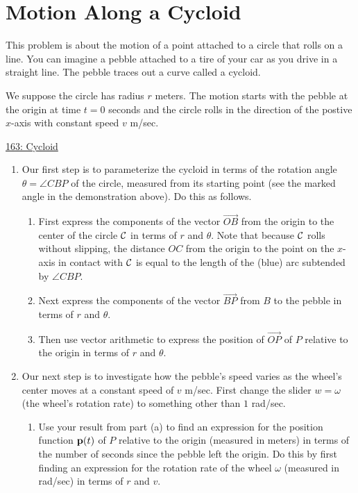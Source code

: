 \documentclass{ximera}
\begin{document}
\section{Motion Along a Cycloid}
\begin{question} \label{Q4950504333}
This problem is about the motion of a point attached to a circle that rolls on a line. You can imagine a pebble attached to a tire of your car as you drive in a straight line. The pebble traces out a curve called a cycloid.

We suppose the circle has radius $r$ meters. The motion starts with the pebble at the origin at time $t=0$ seconds and the circle rolls in the direction of the postive $x$-axis with constant speed $v$ m/sec.

\begin{onlineOnly}
    \begin{center}
\end{center}
\end{onlineOnly}

\href{https://www.geogebra.org/classic/rrzgbtfr}{163: Cycloid}

\begin{enumerate}
\item Our first step is to parameterize the cycloid in terms of the rotation angle $\theta = \angle CBP$ of the circle, measured from its starting point (see the marked angle in the demonstration above). Do this as follows.

\begin{enumerate}
\item First express the components of the vector $\overrightarrow{OB}$ from the origin to the center of the circle ${\cal C}$ in terms of $r$ and $\theta$. Note that because ${\cal C}$ rolls without slipping, the distance $OC$ from the origin to the point on the $x$-axis in contact with ${\cal C}$ is equal to the length of the (blue) arc subtended by $\angle CBP$.

\item Next express the components of the vector $\overrightarrow{BP}$ from $B$ to the pebble in terms of $r$ and $\theta$.

\item Then use vector arithmetic to express the position of $\overrightarrow{OP}$ of $P$ relative to the origin in terms of $r$ and $\theta$.
\end{enumerate}

\item Our next step is to investigate how the pebble's speed varies as the wheel's center moves at a constant speed of $v$ m/sec.
First change the slider $w = \omega$ (the wheel's rotation rate) to something other than $1$ rad/sec.
\begin{enumerate}
\item Use your result from part (a) to find an expression for the position function ${\bf p}(t)$ of $P$ relative to the origin (measured in meters) in terms of the number of seconds since the pebble left the origin. Do this by first finding an expression for the rotation rate of the wheel $\omega$ (measured in rad/sec) in terms of $r$ and $v$.


\end{enumerate}
\end{enumerate}
\end{question}
\end{document}
